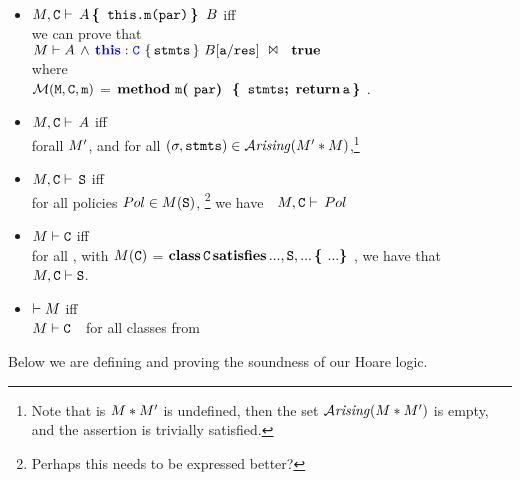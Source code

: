  
  
\begin{definition}
~ \\

\begin{itemize}
\item
$\M, \prg{C} \vdash\, \A \,\lb \, \prg{this.m(par)}\, \rb\, \B$ \SP iff    \\
we can prove that\\
 $\HoareExpl  {\A\, \wedge\,  \sdJ{\kw{this} : \prg{C}}}  {\prg{stmts}} {\M} {\B[\prg{a}/\prg{res}]} {\sd{\kw{true}} }$ %
\\
where\\
  $ \Meths {} {\prg{C}} {\prg{m}}$ = 
$\kw{method} \ \prg{m}\lp  \prg{par}  \rp\ \lb\,    \prg{stmts}\semi\, \kw{return}\, \prg{a}\, \rb$. 

\item
$\M, \prg{C} \vdash\, \A $ \SP iff    \\
forall $\M'$, %
and for all $(\sigma,\code)\in \Arising(\M'*\M)$,\footnote{Note that is $\M * \M'$ is undefined, then the set 
 $\Arising(\M*\M')$ is empty, and the assertion is trivially satisfied.}
\\

\item
$\M, \prg{C} \vdash\, \prg{S}$  \SP iff    \\
for all policies $Pol\in \M{} (\prg{S})$,  \footnote{Perhaps this needs to be expressed better?} 
we have\ \ $\M, \prg{C} \vdash\, Pol$
 
\item
$\M \vdash \prg{C}$ \SP iff  \\
for all , with  $\M{} (\prg{C}) $ = $\kw{class}\,\prg{C}\,\kw{satisfies}\, ..., \prg{S}, ...\, \lb ... \rb$, we have that\ \ \ 
 $\M, \prg{C} \vdash \prg{S}$.
 \item
$  \vdash \M$ iff\\
 $\M \vdash {}\ \ $  
  for all classes \prg{C} from \M
\end{itemize}

\end{definition}


Below we are defining and proving the soundness of our Hoare logic. 

